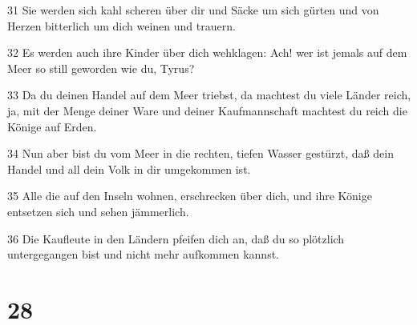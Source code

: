 \par 31 Sie werden sich kahl scheren über dir und Säcke um sich gürten und von Herzen bitterlich um dich weinen und trauern.
\par 32 Es werden auch ihre Kinder über dich wehklagen: Ach! wer ist jemals auf dem Meer so still geworden wie du, Tyrus?
\par 33 Da du deinen Handel auf dem Meer triebst, da machtest du viele Länder reich, ja, mit der Menge deiner Ware und deiner Kaufmannschaft machtest du reich die Könige auf Erden.
\par 34 Nun aber bist du vom Meer in die rechten, tiefen Wasser gestürzt, daß dein Handel und all dein Volk in dir umgekommen ist.
\par 35 Alle die auf den Inseln wohnen, erschrecken über dich, und ihre Könige entsetzen sich und sehen jämmerlich.
\par 36 Die Kaufleute in den Ländern pfeifen dich an, daß du so plötzlich untergegangen bist und nicht mehr aufkommen kannst.

\chapter{28}

